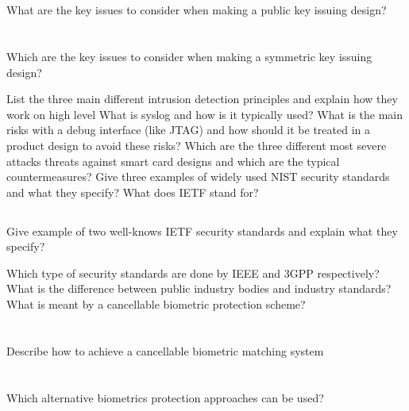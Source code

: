 \begin{questions}
\begin{parts}
  \part{} What are the key issues to consider when making a public key issuing design?
  \part{} Which are the key issues to consider when making a symmetric key issuing design?
  \end{parts}

\question{} List the three main different intrusion detection principles and explain how they work on high level
\question{} What is syslog and how is it typically used?
\question{} What is the main risks with a debug interface (like JTAG) and how should it be treated in a product design to avoid these risks?
\question{} Which are the three different most severe attacks threats against smart card designs and which are the typical countermeasures?
\question{} Give three examples of widely used NIST security standards and what they specify?
\question{} What does IETF stand for?
  \begin{parts}
  \part{} Give example of two well-knows IETF security standards and explain what they specify?
  \end{parts}

\question{} Which type of security standards are done by IEEE and 3GPP respectively?
\question{} What is the difference between public industry bodies and industry standards?
\question{} What is meant by a cancellable biometric protection scheme?
  \begin{parts}
  \part{} Describe how to achieve a cancellable biometric matching system
  \part{} Which alternative biometrics protection approaches can be used?
  \end{parts}
\end{questions}

